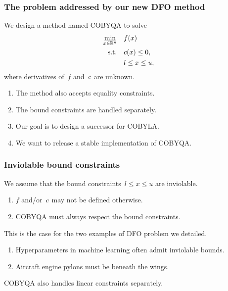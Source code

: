 \documentclass{polyu-presentation}
\newcommand{\con}[1][]{c\ifthenelse{\equal{#1}{}}{}{_{#1}}}
\newcommand{\obj}{f}
\newcommand{\xl}{l}
\newcommand{\xu}{u}
\begin{document}
\begin{frame}
    \frametitle{The problem addressed by our new DFO method}
    
	We design a method named COBYQA to solve
    \begin{align*}
        \min_{x \in \R^n}   & \quad \obj(x)\\
        \text{s.t.}         & \quad \con(x) \le 0,\\
                            & \quad \xl \le x \le \xu,
    \end{align*}
    where derivatives of~$\obj$ and~$\con$ are \alert{unknown}.

    \medskip

    \begin{block}{}
        \begin{enumerate}
            \item The method also accepts equality constraints.
            \item The bound constraints are handled separately.
            \item Our goal is to design a \alert{successor} for COBYLA.
            \item We want to release a stable \alert{implementation} of COBYQA.
        \end{enumerate}
    \end{block}
\end{frame}

\begin{frame}
    \frametitle{Inviolable bound constraints}
    
	\begin{block}{}
        We assume that the bound constraints~$\xl \le x \le \xu$ are \alert{inviolable}.
        \begin{enumerate}
            \item $f$ and/or~$\con$ may \alert{not} be defined otherwise.
            \item COBYQA must \alert{always} respect the bound constraints.
        \end{enumerate}
    \end{block}

    \bigskip

    This is the case for the two examples of DFO problem we detailed.
    \begin{enumerate}
        \item Hyperparameters in machine learning often admit inviolable bounds.
        \item Aircraft engine pylons must be beneath the wings.
    \end{enumerate}

    \bigskip

    \begin{block}{}
        COBYQA also handles \alert{linear constraints} separately.
    \end{block}
\end{frame}
\end{document}
